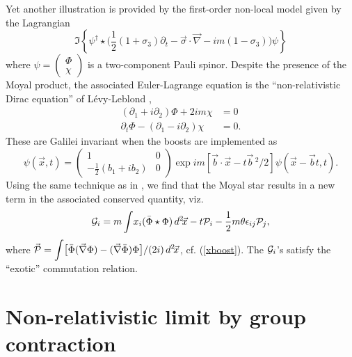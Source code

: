 \documentclass[a4paper,11pt]{article}
\let\ssection=\section
\renewcommand{\section}{\setcounter{equation}{0}\ssection}
\newcommand{\half}{{\scriptstyle{\frac{1}{2}}}}
\newcommand{\vx}{{\vec x}}
\def\p{{\partial}}
\def\vb{{\vec b}}
\def\vx{{\vec x}}
\def\vnabla{{\vec\nabla}}
\begin{document}
Yet another illustration is provided by the first-order
non-local model given by the Lagrangian
\begin{equation}
   \Im\left\{\psi^\dagger\star\Big(\half(1+\sigma_{3})\p_{t}
    -\vec{\sigma}\cdot\vnabla-im(1-\sigma_{3})\Big)\psi\right\}
    \label{MLL}
\end{equation}
where $\psi=\left(\begin{array}{c}\Phi\\ \chi
\end{array}\right)$
is a two-component Pauli spinor.
Despite the presence of the Moyal product, the associated
Euler-Lagrange equation is the
``non-relativistic Dirac equation''  of L\'evy-Leblond \cite{LL},
\begin{equation}
    \begin{array}{ll}
    (\p_{1}+i\p_{2})\Phi+2im\chi&=0
    \\[8pt]
    \p_{t}\Phi-(\p_{1}-i\p_{2})\chi&=0.
    \end{array}
    \label{LLeq}
\end{equation}
These are Galilei invariant when the boosts are implemented as \cite{LL}
\begin{equation}
    \psi(\vx,t)=\left(\begin{array}{cc}1&0\\
    -\half (b_{1}+ib_{2})&0
    \end{array}\right)
	\exp im[\vb\cdot\vx-t\vb{\,}^2/2]\psi(\vx-\vb t,t).
    \label{boostLL}
    \end{equation}
Using the same technique as in \cite{HoMa}, we find that the  Moyal
star results in a new term in the associated conserved quantity, viz.
\begin{equation}
     {\cal G}_{i}=m\int\!x_{i}(\bar{\Phi}\star\Phi)\, d^{2}\!\vx
     -t{\cal P}_{i}
     -\frac{1}{2} m\theta\epsilon_{ij}{\cal P}_{j},
     \label{LLboost}
\end{equation}
where
$
\vec{\displaystyle{\cal P}}=
\displaystyle{\int}\big[\bar{\Phi}(\vnabla\Phi)-
(\vnabla\bar{\Phi})\Phi\big]/(2i)\,d^{2}\!\vx
$,
cf. (\ref{xboost}). The ${\cal G}_{i}$'s satisfy the ``exotic''
commutation relation.
\goodbreak

\section{Non-relativistic limit by group contraction}\label{NRlimit}
\end{document}

